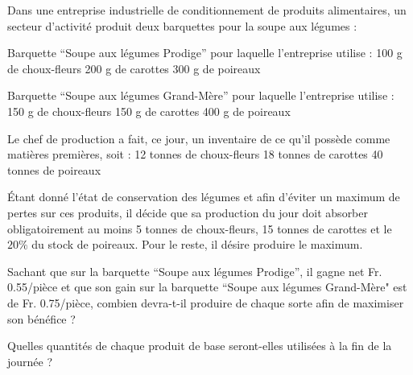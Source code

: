 \begin{exercice}
Dans une entreprise industrielle de conditionnement de produits alimentaires, un secteur d’activité produit deux barquettes pour la soupe aux légumes :

Barquette “Soupe aux légumes Prodige” pour laquelle l’entreprise utilise :
100 g de choux-fleurs
200 g de carottes
300 g de poireaux

Barquette “Soupe aux légumes Grand-Mère” pour laquelle l’entreprise utilise :
150 g de choux-fleurs
150 g de carottes
400 g de poireaux

Le chef de production a fait, ce jour, un inventaire de ce qu'il possède comme matières premières, soit : 
12 tonnes de choux-fleurs
18 tonnes de carottes
40 tonnes de poireaux

Étant donné l'état de conservation des légumes et afin d'éviter un maximum de pertes sur ces produits, il décide que sa production du jour doit absorber obligatoirement au moins 5 tonnes de choux-fleurs, 15 tonnes de carottes et le $20 \%$ du stock de poireaux. Pour le reste, il désire produire le maximum.

Sachant que sur la barquette “Soupe aux légumes Prodige”, il gagne net Fr. 0.55/pièce et que son gain sur la barquette “Soupe aux légumes Grand-Mère" est de Fr. 0.75/pièce, combien devra-t-il produire de chaque sorte afin de maximiser son bénéfice ?

Quelles quantités de chaque produit de base seront-elles utilisées à la fin de la journée ? 
\end{exercice}

